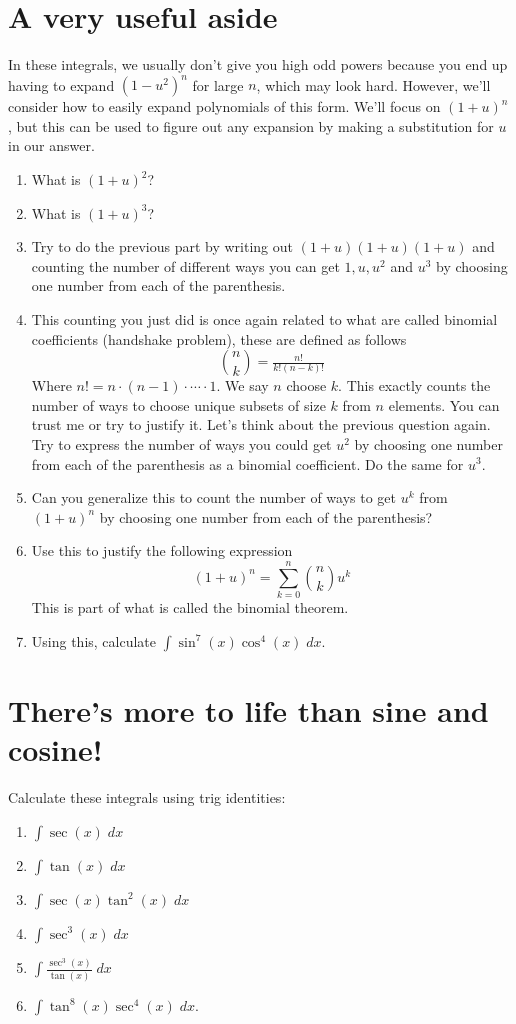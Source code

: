 \documentclass[11pt]{article}  %
\theoremstyle{definition}
\theoremstyle{remark}
\begin{document}
\section{A very useful aside}
In these integrals, we usually don't give you high odd powers because you end up having to expand $(1-u^2)^n$ for large $n$, which may look hard. However, we'll consider how to easily expand polynomials of this form. We'll focus on $(1+u)^n$, but this can be used to figure out any expansion by making a substitution for $u$ in our answer. 
\begin{enumerate}
\item What is $(1+u)^2$?
\item What is $(1+u)^3$?
\item Try to do the previous part by writing out $(1+u)(1+u)(1+u)$ and counting the number of different ways you can get $1, u, u^2$ and $u^3$ by choosing one number from each of the parenthesis. 
\item This counting you just did is once again related to what are called binomial coefficients (handshake problem), these are defined as follows
\[
\binom{n}{k} = \tfrac{n!}{k!(n-k)!}
\]
Where $n! = n \cdot (n-1) \cdot \cdots \cdot 1$. We say $n$ choose $k$. This exactly counts the number of ways to choose unique subsets of size $k$ from $n$ elements. You can trust me or try to justify it. Let's think about the previous question again. Try to express the number of ways you could get $u^2$ by choosing one number from each of the parenthesis as a binomial coefficient. Do the same for $u^3$.
\item Can you generalize this to count the number of ways to get $u^k$ from $(1+u)^n$ by choosing one number from each of the parenthesis?
\item Use this to justify the following expression
\[
(1+u)^n = \sum_{k=0}^n \binom{n}{k} u^k
\]
This is part of what is called the binomial theorem.
\item Using this, calculate $\int \sin^{7}(x) \cos^{4}(x) \; dx$.
\end{enumerate}


\section{There's more to life than sine and cosine!}
Calculate these integrals using trig identities:
\begin{enumerate}
\item $\int \sec(x) \; dx$
\item $\int \tan(x) \; dx$
\item $\int \sec(x) \tan^2(x) \; dx$
\item $\int \sec^3(x) \; dx$
\item $\int \tfrac{\sec^3(x)}{\tan(x)} \; dx$
\item $\int \tan^8(x) \sec^4(x) \; dx$.
\end{enumerate}
\end{document}
